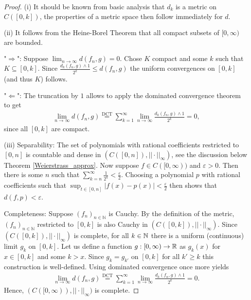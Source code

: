 \begin{proof}[Proof]
(i) It should be known from basic analysis that $d_k$ is a metric on $C([0,k])$, the properties of a metric space then follow immediately for $d$.\smallskip

(ii) It follows from the Heine-Borel Theorem that all compact subsets of $[0,\infty)$ are bounded. \smallskip
		
		"$\Rightarrow$": Suppose $\lim_{n\to\infty} d(f_n,g)=0$. Chose $K$ compact and some $k$ such that $K\subseteq [0,k]$. Since $\frac{d_k(f_n,g)\wedge 1}{2^k}\leq d(f_n,g)$ the uniform convergences on $[0,k]$ (and thus $K$) follows.\smallskip
	
		"$\Leftarrow$": The truncation by $1$ allows to apply the dominated convergence theorem to get
		\begin{align*}
			\lim_{n\to\infty}d(f_n,g) \overset{\text{DCT}}{=} \sum_{k=1}^{\infty} \lim_{n\to \infty} \frac{d_k(f_n,g)\wedge 1}{2^k}=0,			
		\end{align*}
			since all $[0,k]$ are compact.\smallskip

		 (iii) Separability: The set of polynomials with rational coefficients restricted to $[0,n]$ is countable and dense in $(C([0,n]),||\cdot||_\infty)$, see the discussion below Theorem \ref{Weierstrass_approx}. Now suppose $f\in C([0,\infty))$ and $\varepsilon>0$. Then there is some $n$ such that $\sum_{k=n}^\infty \frac{1}{2^k}<\frac{\varepsilon}{2}$. Choosing a polynomial $p$ with rational coefficients such that $\sup_{t\in [0,n]}|f(x)-p(x)|<\frac{\varepsilon}{2}$ then shows that $d(f,p)<\varepsilon$.\smallskip		 
		 
		Completeness: Suppose $(f_n)_{n\in\mathbb{N}}$ is Cauchy. By the definition of the metric, $(f_n)_{n\in\mathbb{N}}$ restricted to $[0,k]$ is also Cauchy in $(C([0,k]),||\cdot||_\infty)$. Since $( C([0,k]), ||\cdot||_\infty)$ is complete, for all $k\in\mathbb{N}$ there is a uniform (continuous) limit $g_k$ on $[0,k]$. Let us define a function $g:[0,\infty)\to \mathbb{R}$ as $g_k(x)$ for $x\in [0,k]$ and some $k>x$. Since $g_k = g_{k'}$ on $[0,k]$ for all $k' \geq k$ this construction is well-defined. Using dominated convergence once more yields
		\begin{align*}
			\lim_{n\to\infty}d(f_n,g) \overset{\text{DCT}}{=} \sum_{k=1}^{\infty} \lim_{n\to\infty} \frac{d_k(f_n,g)\wedge 1}{2^k} = 0.
		\end{align*}
		Hence, $( C([0,\infty)),||\cdot||_\infty)$ is complete.
\end{proof}

